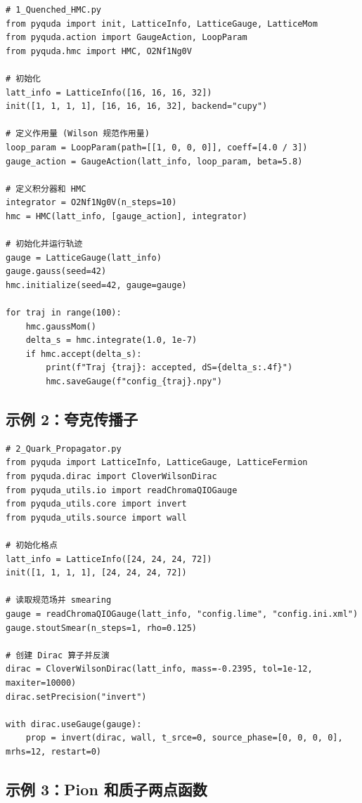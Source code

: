 \documentclass[12pt,a4paper]{ctexart}
\begin{document}
\begin{lstlisting}[style=pycode]
# 1_Quenched_HMC.py
from pyquda import init, LatticeInfo, LatticeGauge, LatticeMom
from pyquda.action import GaugeAction, LoopParam
from pyquda.hmc import HMC, O2Nf1Ng0V

# 初始化
latt_info = LatticeInfo([16, 16, 16, 32])
init([1, 1, 1, 1], [16, 16, 16, 32], backend="cupy")

# 定义作用量 (Wilson 规范作用量)
loop_param = LoopParam(path=[[1, 0, 0, 0]], coeff=[4.0 / 3])
gauge_action = GaugeAction(latt_info, loop_param, beta=5.8)

# 定义积分器和 HMC
integrator = O2Nf1Ng0V(n_steps=10)
hmc = HMC(latt_info, [gauge_action], integrator)

# 初始化并运行轨迹
gauge = LatticeGauge(latt_info)
gauge.gauss(seed=42)
hmc.initialize(seed=42, gauge=gauge)

for traj in range(100):
    hmc.gaussMom()
    delta_s = hmc.integrate(1.0, 1e-7)
    if hmc.accept(delta_s):
        print(f"Traj {traj}: accepted, dS={delta_s:.4f}")
        hmc.saveGauge(f"config_{traj}.npy")
\end{lstlisting}

\subsection{示例 2：夸克传播子}

\begin{lstlisting}[style=pycode]
# 2_Quark_Propagator.py
from pyquda import LatticeInfo, LatticeGauge, LatticeFermion
from pyquda.dirac import CloverWilsonDirac
from pyquda_utils.io import readChromaQIOGauge
from pyquda_utils.core import invert
from pyquda_utils.source import wall

# 初始化格点
latt_info = LatticeInfo([24, 24, 24, 72])
init([1, 1, 1, 1], [24, 24, 24, 72])

# 读取规范场并 smearing
gauge = readChromaQIOGauge(latt_info, "config.lime", "config.ini.xml")
gauge.stoutSmear(n_steps=1, rho=0.125)

# 创建 Dirac 算子并反演
dirac = CloverWilsonDirac(latt_info, mass=-0.2395, tol=1e-12, maxiter=10000)
dirac.setPrecision("invert")

with dirac.useGauge(gauge):
    prop = invert(dirac, wall, t_srce=0, source_phase=[0, 0, 0, 0], mrhs=12, restart=0)
\end{lstlisting}

\subsection{示例 3：Pion 和质子两点函数}
\end{document}
